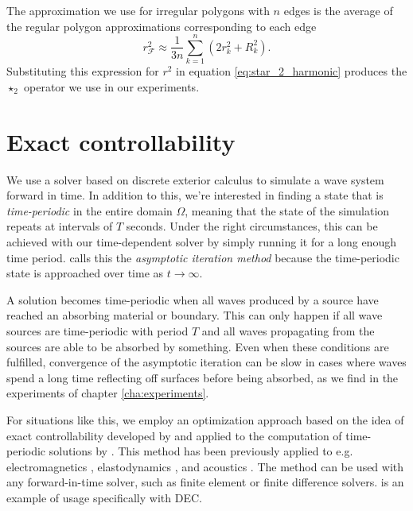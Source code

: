 \documentclass[utf8,english]{gradu3}
\begin{document}
The approximation we use for irregular polygons with $n$ edges is the average
of the regular polygon approximations corresponding to each edge
\begin{equation}\label{eq:polygon_approx_radius}
  r^2_{\mathcal{F}} \approx \frac{1}{3n} \sum_{k=1}^n (2r_k^2 + R_k^2).
\end{equation}
Substituting this expression for $r^2$ in equation \eqref{eq:star_2_harmonic}
produces the $\star_2$ operator we use in our experiments.


\chapter{Exact controllability}\label{cha:controllability}

We use a solver based on discrete exterior calculus to simulate
a wave system forward in time.
In addition to this, we're interested in finding a state that is
\textit{time-periodic} in the entire domain $\Omega$,
meaning that the state of the simulation repeats at intervals of $T$ seconds.
Under the right circumstances, this can be achieved with our time-dependent solver
by simply running it for a long enough time period.
\textcite{rabina_numerical_2014} calls this the \textit{asymptotic iteration method}
because the time-periodic state is approached over time as $t \rightarrow \infty$.

A solution becomes time-periodic when all waves produced by a source
have reached an absorbing material or boundary.
This can only happen if all wave sources are time-periodic with period $T$
and all waves propagating from the sources are able to be absorbed by something.
Even when these conditions are fulfilled,
convergence of the asymptotic iteration can be slow in cases
where waves spend a long time reflecting off surfaces before being absorbed,
as we find in the experiments of chapter \ref{cha:experiments}.

For situations like this, we employ an optimization approach
based on the idea of exact controllability developed by \textcite{lions_exact_1988}
and applied to the computation of time-periodic solutions by
\textcite{bristeau_controllability_1998}.
This method has been previously applied to e.g.
electromagnetics \parencite{rabina_numerical_2014},
elastodynamics \parencite{monkola_time-harmonic_2008},
and acoustics \parencite{kahkonen_solution_2011}.
The method can be used with any forward-in-time solver,
such as finite element or finite difference solvers.
\parencite{rabina_numerical_2014} is an example of usage specifically with DEC.
\end{document}
